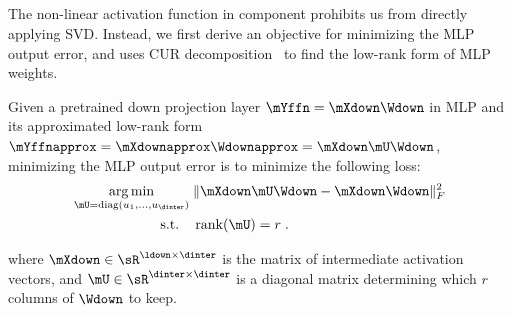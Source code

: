\subsection{\texorpdfstring{\mymethodmlp}{A3-MLP}}
\label{sec:method:ffn}

The non-linear activation function in \mlp{} component prohibits us from directly applying SVD.
Instead, we first derive an objective for minimizing the MLP output error,
and uses CUR decomposition~\citep{CUR-matrix-decompositions-for-improved-data-analysis} to find the low-rank form of MLP weights.

\begin{problem}\label{problem:mlp}
Given a pretrained down
projection layer $\mYffn = \mXdown \Wdown$ in MLP
and its approximated low-rank form $\mYffnapprox = \mXdownapprox \Wdownapprox = \mXdown \mU \Wdown$, 
minimizing the MLP output error is to minimize the following loss: 
\begin{equation}
\begin{aligned}
    \underset{\mU=\operatorname{diag}(u_1,\dots,u_\dinter)}{\mathrm{arg\,min}}
    \;& \|\mXdown \mU \Wdown - \mXdown \Wdown\|_F^2 \\
    \text{s.t.} \quad
    & \operatorname{rank}(\mU) = r \; .
\end{aligned}
\end{equation}

where $\mXdown \in \sR^{\ldown \times \dinter}$ is the matrix of intermediate activation vectors,
and $\mU \in \sR^{\dinter \times \dinter}$ is a diagonal matrix determining which $r$ columns of $\Wdown$ to keep.

\end{problem}


